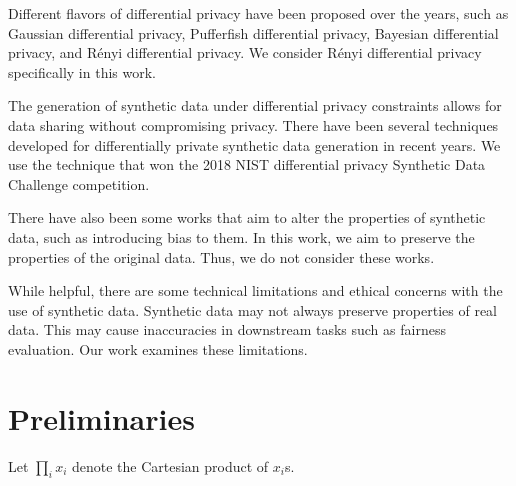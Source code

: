 \documentclass[manuscript,screen,review,anonymous]{acmart}
\begin{document}
Different flavors of differential privacy have been proposed over the years\cite{desfontaines2019sok}, such as Gaussian differential privacy\cite{dong2022gaussian}, Pufferfish differential privacy\cite{kifer2012rigorous}, Bayesian differential privacy\cite{triastcyn2020bayesian}, and R\'enyi differential privacy\cite{mironov2017renyi}. We consider R\'enyi differential privacy specifically in this work.


The generation of synthetic data\cite{raghunathan2021synthetic,lu2023machine} under differential privacy constraints allows for data sharing without compromising privacy\cite{tao2021benchmarking}. There have been several techniques developed for differentially private synthetic data generation\cite{rosenblatt2020differentially,fan2020relational,bowen2019comparative,bowen2020comparative,arnold2020really,xu2019modeling} in recent years. We use the technique that won the 2018 NIST differential privacy Synthetic Data Challenge competition\cite{mckenna2021winning}.

There have also been some works that aim to alter the properties of synthetic data, such as introducing bias to them\cite{jiang2024synthetic,baumann2023bias}. In this work, we aim to preserve the properties of the original data. Thus, we do not consider these works.

While helpful, there are some technical limitations\cite{stadler2022synthetic,cheng2021can,ganev2022robin,wyllie2024fairness} and ethical concerns\cite{whitney2024real} with the use of synthetic data. Synthetic data may not always preserve properties of real data. This may cause inaccuracies in downstream tasks such as fairness evaluation. Our work examines these limitations.

\section{Preliminaries}
\label{sec:prelim}

Let $\prod_i x_i$ denote the Cartesian product of $x_i$s.
\end{document}
